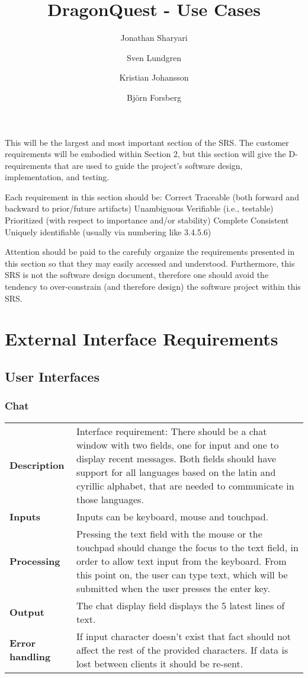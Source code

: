 \documentclass[a4paper,10pt]{article}
\title{\textbf{DragonQuest - Use Cases}}
\author{Jonathan Sharyari \and Sven Lundgren \and Kristian Johansson \and Bj{\"o}rn Forsberg}
\newcommand{\requirement}[1]{\subsubsection{#1}\begin{tabular}{l p{12.2cm}}}
\newcommand{\reqsection}[1]{\\ \textbf{#1} &}
\newcommand{\stoprequirement}{\end{tabular}}
\begin{document}
\maketitle
This will be the largest and most important section of the SRS. The customer requirements will be embodied within Section 2, but this section will give the D-requirements that are used to guide the project's software design, implementation, and testing.

Each requirement in this section should be:
Correct
Traceable (both forward and backward to prior/future artifacts)
Unambiguous
Verifiable (i.e., testable)
Prioritized (with respect to importance and/or stability)
Complete
Consistent
Uniquely identifiable (usually via numbering like 3.4.5.6)

Attention should be paid to the carefuly organize the requirements presented in this section so that they may easily accessed and understood.  Furthermore, this SRS is not the software design document, therefore one should avoid the tendency to over-constrain (and therefore design) the software project within this SRS.

\section{External Interface Requirements}
\subsection{User Interfaces}

\requirement{Chat}
\reqsection{Description}
Interface requirement: There should be a chat window with two fields, one for input and one to display recent messages. Both fields should have support for all languages based on the latin and cyrillic alphabet, that are needed to communicate in those languages.

\reqsection{Inputs}
Inputs can be keyboard, mouse and touchpad.

\reqsection{Processing}
Pressing the text field with the mouse or the touchpad should change the focus to the text field, in order to allow text input from the keyboard. From this point on, the user can type text, which will be submitted when the user presses the enter key. 

\reqsection{Output}
The chat display field displays the 5 latest lines of text. 

\reqsection{Error handling}
If input character doesn't exist that fact should not affect the rest of the provided characters. If data is lost between clients it should be re-sent.
\stoprequirement
\end{document}
